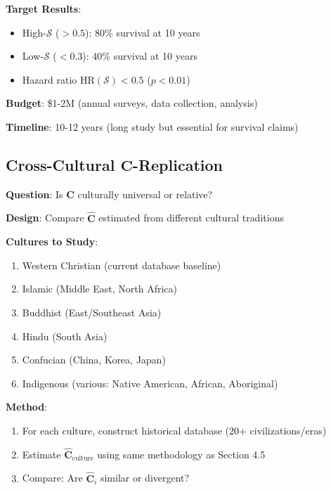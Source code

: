 \documentclass[11pt,a4paper]{article}
\theoremstyle{definition}
\theoremstyle{remark}
\begin{document}
\begin{small}
\begin{enumerate}
\begin{protocol}
\textbf{Target Results}:
\begin{itemize}
    \item High-\(\mathcal{S}\) (\(> 0.5\)): 80\% survival at 10 years
    \item Low-\(\mathcal{S}\) (\(< 0.3\)): 40\% survival at 10 years
    \item Hazard ratio \(\text{HR}(\mathcal{S}) < 0.5\) (\(p < 0.01\))
\end{itemize}

\textbf{Budget}: \$1-2M (annual surveys, data collection, analysis)

\textbf{Timeline}: 10-12 years (long study but essential for survival claims)
\end{protocol}

\subsection{Cross-Cultural \(\mathbf{C}\)-Replication}

\begin{protocol}
\textbf{Question}: Is \(\mathbf{C}\) culturally universal or relative?

\textbf{Design}: Compare \(\hat{\mathbf{C}}\) estimated from different cultural traditions

\textbf{Cultures to Study}:
\begin{enumerate}
    \item Western Christian (current database baseline)
    \item Islamic (Middle East, North Africa)
    \item Buddhist (East/Southeast Asia)
    \item Hindu (South Asia)
    \item Confucian (China, Korea, Japan)
    \item Indigenous (various: Native American, African, Aboriginal)
\end{enumerate}

\textbf{Method}:
\begin{enumerate}
    \item For each culture, construct historical database (20+ civilizations/eras)
    \item Estimate \(\hat{\mathbf{C}}_{\text{culture}}\) using same methodology as Section 4.5
    \item Compare: Are \(\hat{\mathbf{C}}_i\) similar or divergent?
\end{enumerate}


\end{protocol}
\end{enumerate}
\end{small}
\end{document}
